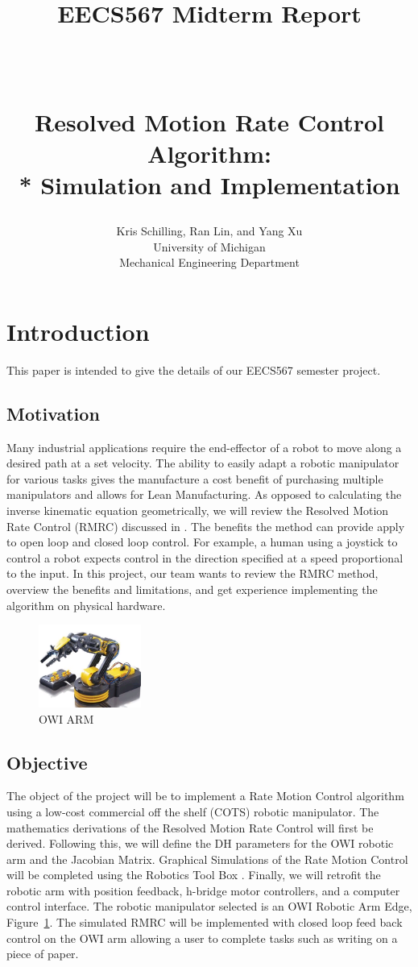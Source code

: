 \documentclass[paper=letter, fontsize=10pt]{scrartcl}	%
\title{ \vspace{-.25in} 	\usefont{OT1}{bch}{b}{n}
		\huge \strut EECS567 Midterm Report \strut \\
		\Large \bfseries \strut Resolved Motion Rate Control Algorithm: \\* Simulation and Implementation  \strut
}
\author{ 									\usefont{OT1}{bch}{m}{n}
        Kris Schilling, Ran Lin, and Yang Xu\\		\usefont{OT1}{bch}{m}{n}
        University of Michigan\\	\usefont{OT1}{bch}{m}{n}
        Mechanical Engineering Department\\
}
\date{}
\numberwithin{equation}{section}															%
\numberwithin{figure}{section}																%
\numberwithin{table}{section}																%
\begin{document}
\maketitle
\section{Introduction}
This paper is intended to give the details of our EECS567 semester project.

\subsection{Motivation}
Many industrial applications require the end-effector of a robot to move along a desired path at a set velocity. The ability to easily adapt a robotic manipulator for various tasks gives the manufacture a cost benefit of purchasing multiple manipulators and allows for Lean Manufacturing. As opposed to calculating the inverse kinematic equation geometrically, we will review the Resolved Motion Rate Control (RMRC) discussed in \cite{whitney1969resolved}. The benefits the method can provide apply to open loop and closed loop control. For example, a human using a joystick to control a robot expects control in the direction specified at a speed proportional to the input. In this project, our team wants to review the RMRC method, overview the benefits and limitations, and get experience implementing the algorithm on physical hardware.

\begin{figure}[h!]
  \centering
    \includegraphics[width=0.3\textwidth]{./Images/OWI}
    \caption{OWI ARM}
    \label{fig:OWI}
\end{figure}

\subsection{Objective}
The object of the project will be to implement a Rate Motion Control algorithm using a low-cost commercial off the shelf (COTS) robotic manipulator. The mathematics derivations of the Resolved Motion Rate Control will first be derived. Following this, we will define the DH parameters for the OWI robotic arm and the Jacobian Matrix. Graphical Simulations of the Rate Motion Control will be completed using the Robotics Tool Box \cite{corke1996robotics}. Finally, we will retrofit the robotic arm with position feedback, h-bridge motor controllers, and a computer control interface. The robotic manipulator selected is an OWI Robotic Arm Edge, Figure~\ref{fig:OWI}. The simulated RMRC will be implemented with closed loop feed back control on the OWI arm allowing a user to complete tasks such as writing on a piece of paper. 
\end{document}
